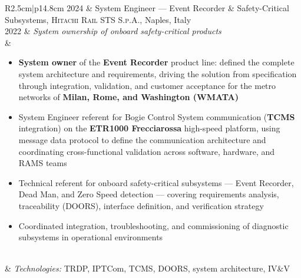 \begin{longtable}{R{2.5cm}|p{14.8cm}}
	\textsc{2024} & System Engineer --- Event Recorder \& Safety-Critical Subsystems, \textsc{Hitachi Rail STS S.p.A.}, Naples, Italy\\
	\textsc{2022} & \emph{System ownership of onboard safety-critical products}\\&
	\footnotesize{
		\begin{itemize}
			\item \textbf{System owner} of the \textbf{Event Recorder} product line: defined the complete system architecture and requirements, driving the solution from specification through integration, validation, and customer acceptance for the metro networks of \textbf{Milan, Rome, and Washington (WMATA)}
			\item System Engineer referent for Bogie Control System communication (\textbf{TCMS} integration) on the \textbf{ETR1000 Frecciarossa} high-speed platform, using message data protocol to define the communication architecture and coordinating cross-functional validation across software, hardware, and RAMS teams
			\item Technical referent for onboard safety-critical subsystems --- Event Recorder, Dead Man, and Zero Speed detection --- covering requirements analysis, traceability (DOORS), interface definition, and verification strategy
			\item Coordinated integration, troubleshooting, and commissioning of diagnostic subsystems in operational environments
		\end{itemize}
		\vspace{-1em}
	}\\&
	\footnotesize{\emph{Technologies:} TRDP, IPTCom, TCMS, DOORS, system architecture, IV\&V}\\
\\


\end{longtable}
